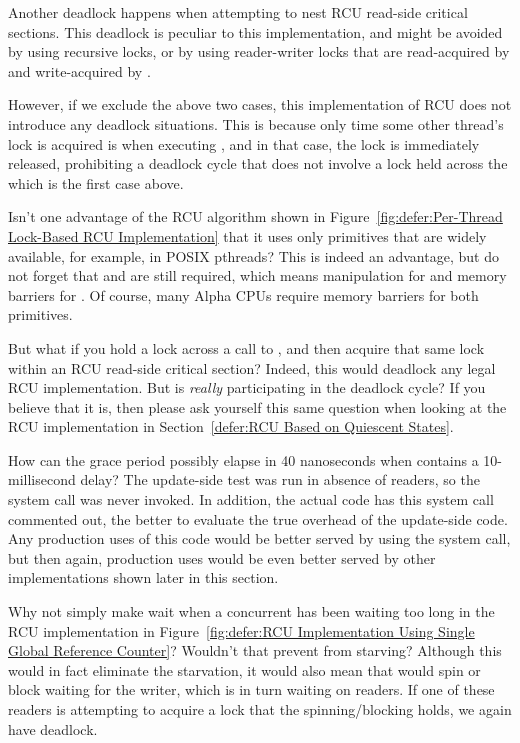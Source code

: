 \begin{enumerate}
	Another deadlock happens when attempting to nest RCU read-side
	critical sections.
	This deadlock is peculiar to this implementation, and might
	be avoided by using recursive locks, or by using reader-writer
	locks that are read-acquired by  and
	write-acquired by .

	However, if we exclude the above two cases,
	this implementation of RCU does not introduce any deadlock
	situations.
	This is because only time some other thread's lock is acquired is when
	executing , and in that case, the lock
	is immediately released, prohibiting a deadlock cycle that
	does not involve a lock held across the 
	which is the first case above.

\QuickQ{}
	Isn't one advantage of the RCU algorithm shown in
	Figure~\ref{fig:defer:Per-Thread Lock-Based RCU Implementation}
	that it uses only primitives that are widely available,
	for example, in POSIX pthreads?
\QuickA{}
	This is indeed an advantage, but do not forget that
	 and 
	are still required, which means  manipulation
	for  and memory barriers for
	.
	Of course, many Alpha CPUs require memory barriers for both
	primitives.

\QuickQ{}
	But what if you hold a lock across a call to
	, and then acquire that same lock within
	an RCU read-side critical section?
\QuickA{}
	Indeed, this would deadlock any legal RCU implementation.
	But is  \emph{really} participating in
	the deadlock cycle?
	If you believe that it is, then please
	ask yourself this same question when looking at the
	RCU implementation in
	Section~\ref{defer:RCU Based on Quiescent States}.

\QuickQ{}
	How can the grace period possibly elapse in 40 nanoseconds when
	 contains a 10-millisecond delay?
\QuickA{}
	The update-side test was run in absence of readers, so the
	 system call was never invoked.
	In addition, the actual code has this 
	system call commented out, the better to evaluate the
	true overhead of the update-side code.
	Any production uses of this code would be better served by
	using the  system call, but then again,
	production uses would be even better served by other implementations
	shown later in this section.

\QuickQ{}
	Why not simply make  wait when a concurrent
	 has been waiting too long in
	the RCU implementation in
	Figure~\ref{fig:defer:RCU Implementation Using Single Global Reference Counter}?
	Wouldn't that prevent  from starving?
\QuickA{}
	Although this would in fact eliminate the starvation, it would
	also mean that  would spin or block waiting
	for the writer, which is in turn waiting on readers.
	If one of these readers is attempting to acquire a lock that
	the spinning/blocking  holds, we again
	have deadlock.


\end{enumerate}
